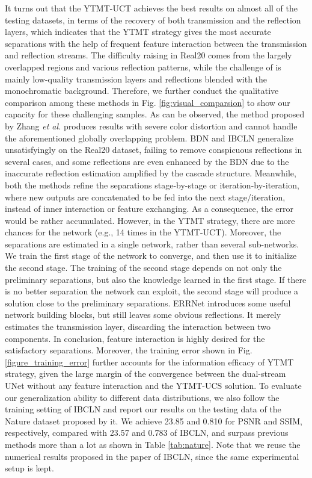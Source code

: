 \documentclass{article}
\begin{document}
It turns out that the YTMT-UCT achieves the best results on almost all of the testing datasets, in terms of the recovery of both transmission and the reflection layers, which indicates that the YTMT strategy gives the most accurate separations with the help of frequent feature interaction between the transmission and reflection streams. The difficulty raising in Real20 comes from the largely overlapped regions and various reflection patterns, while the challenge of  is mainly low-quality transmission layers and reflections blended with the monochromatic background. Therefore, we further conduct the qualitative comparison among these methods in Fig. \ref{fig:visual_comparsion} to show our capacity for these challenging samples. As can be observed, the method proposed by Zhang \emph{et al.} produces results with severe color distortion and cannot handle the aforementioned globally overlapping problem. BDN and IBCLN generalize unsatisfyingly on the Real20 dataset, failing to remove conspicuous reflections in several cases, and some reflections are even enhanced by the BDN due to the inaccurate reflection estimation amplified by the cascade structure. Meanwhile, both the methods refine the separations stage-by-stage or iteration-by-iteration, where new outputs are concatenated to be fed into the next stage/iteration, instead of inner interaction or feature exchanging. As a consequence, the error would be rather accumulated. However, in the YTMT strategy, there are more chances for the network (e.g., 14 times in the YTMT-UCT). Moreover, the separations are estimated in a single network, rather than several sub-networks. We train the first stage of the network to converge, and then use it to initialize the second stage. The training of the second stage depends on not only the preliminary separations, but also the knowledge learned in the first stage. If there is no better separation the network can exploit, the second stage will produce a solution close to the preliminary separations. ERRNet introduces some useful network building blocks, but still leaves some obvious reflections. It merely estimates the transmission layer, discarding the interaction between two components. In conclusion, feature interaction is highly desired for the satisfactory separations. Moreover, the training error shown in Fig. \ref{figure_training_error} further accounts for the information efficacy of YTMT strategy, given the large margin of the convergence between the dual-stream UNet without any feature interaction and the YTMT-UCS solution.
To evaluate our generalization ability to different data distributions, we also follow the training setting of IBCLN \cite{DBLP:conf/cvpr/LiY0LH20} and report our results on the testing data of the Nature dataset proposed by it. We achieve 23.85 and 0.810 for PSNR and SSIM, respectively, compared with 23.57 and 0.783 of IBCLN, and surpass previous methods more than a lot as shown in Table \ref{tab:nature}. Note that we reuse the numerical results proposed in the paper of IBCLN, since the same experimental setup is kept. 
\end{document}
